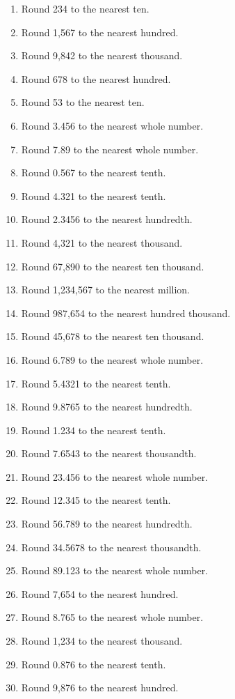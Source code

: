 \documentclass[12pt]{article}
\begin{document}
\begin{enumerate}
    \item Round 234 to the nearest ten.
    \item Round 1,567 to the nearest hundred.
    \item Round 9,842 to the nearest thousand.
    \item Round 678 to the nearest hundred.
    \item Round 53 to the nearest ten.
    
    \item Round 3.456 to the nearest whole number.
    \item Round 7.89 to the nearest whole number.
    \item Round 0.567 to the nearest tenth.
    \item Round 4.321 to the nearest tenth.
    \item Round 2.3456 to the nearest hundredth.
    
    \item Round 4,321 to the nearest thousand.
    \item Round 67,890 to the nearest ten thousand.
    \item Round 1,234,567 to the nearest million.
    \item Round 987,654 to the nearest hundred thousand.
    \item Round 45,678 to the nearest ten thousand.
    
    \item Round 6.789 to the nearest whole number.
    \item Round 5.4321 to the nearest tenth.
    \item Round 9.8765 to the nearest hundredth.
    \item Round 1.234 to the nearest tenth.
    \item Round 7.6543 to the nearest thousandth.
    
    \item Round 23.456 to the nearest whole number.
    \item Round 12.345 to the nearest tenth.
    \item Round 56.789 to the nearest hundredth.
    \item Round 34.5678 to the nearest thousandth.
    \item Round 89.123 to the nearest whole number.
    
    \item Round 7,654 to the nearest hundred.
    \item Round 8.765 to the nearest whole number.
    \item Round 1,234 to the nearest thousand.
    \item Round 0.876 to the nearest tenth.
    \item Round 9,876 to the nearest hundred.
    

\end{enumerate}
\end{document}
